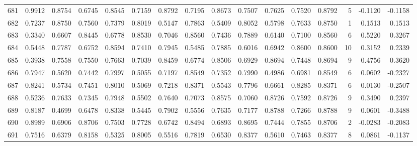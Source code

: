 \begin{tabular}{lrrrrrrrrrrrrrrr}
681 &      0.9912 &  0.8754 &  0.6745 &  0.8545 &  0.7159 &  0.8792 &  0.7195 &  0.8673 &  0.7507 &  0.7625 &   0.7520 &     0.8792 &      5 &                   -0.1120 &                    -0.1158 \\
682 &      0.7237 &  0.8750 &  0.7560 &  0.7379 &  0.8019 &  0.5147 &  0.7863 &  0.5409 &  0.8052 &  0.5798 &   0.7633 &     0.8750 &      1 &                    0.1513 &                     0.1513 \\
683 &      0.3340 &  0.6607 &  0.8445 &  0.6778 &  0.8530 &  0.7046 &  0.8560 &  0.7436 &  0.7889 &  0.6140 &   0.7100 &     0.8560 &      6 &                    0.5220 &                     0.3267 \\
684 &      0.5448 &  0.7787 &  0.6752 &  0.8594 &  0.7410 &  0.7945 &  0.5485 &  0.7885 &  0.6016 &  0.6942 &   0.8600 &     0.8600 &     10 &                    0.3152 &                     0.2339 \\
685 &      0.3938 &  0.7558 &  0.7550 &  0.7663 &  0.7039 &  0.8459 &  0.6774 &  0.8506 &  0.6929 &  0.8694 &   0.7448 &     0.8694 &      9 &                    0.4756 &                     0.3620 \\
686 &      0.7947 &  0.5620 &  0.7442 &  0.7997 &  0.5055 &  0.7197 &  0.8549 &  0.7352 &  0.7990 &  0.4986 &   0.6981 &     0.8549 &      6 &                    0.0602 &                    -0.2327 \\
687 &      0.8241 &  0.5734 &  0.7451 &  0.8010 &  0.5069 &  0.7218 &  0.8371 &  0.5543 &  0.7796 &  0.6661 &   0.8285 &     0.8371 &      6 &                    0.0130 &                    -0.2507 \\
688 &      0.5236 &  0.7633 &  0.7345 &  0.7948 &  0.5502 &  0.7640 &  0.7073 &  0.8575 &  0.7060 &  0.8726 &   0.7592 &     0.8726 &      9 &                    0.3490 &                     0.2397 \\
689 &      0.8187 &  0.4699 &  0.6478 &  0.8338 &  0.5445 &  0.7902 &  0.5556 &  0.7635 &  0.7177 &  0.8788 &   0.7266 &     0.8788 &      9 &                    0.0601 &                    -0.3488 \\
690 &      0.8989 &  0.6906 &  0.8706 &  0.7503 &  0.7728 &  0.6742 &  0.8494 &  0.6893 &  0.8695 &  0.7444 &   0.7855 &     0.8706 &      2 &                   -0.0283 &                    -0.2083 \\
691 &      0.7516 &  0.6379 &  0.8158 &  0.5325 &  0.8005 &  0.5516 &  0.7819 &  0.6530 &  0.8377 &  0.5610 &   0.7463 &     0.8377 &      8 &                    0.0861 &                    -0.1137 \\

\end{tabular}
